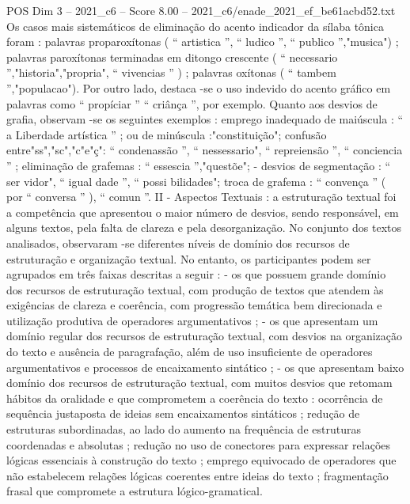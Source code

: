 \begin{textsample}{POS Dim 3 – 2021\_c6 – Score 8.00 – 2021\_c6/enade\_2021\_ef\_be61acbd52.txt}
Os casos mais sistemáticos de eliminação do acento indicador da sílaba tônica foram : palavras proparoxítonas ( “ artistica ”, “ ludico ”, “ publico ”,"musica") ; palavras paroxítonas terminadas em ditongo crescente ( “ necessario ”,"historia","propria", “ vivencias ” ) ; palavras oxítonas ( “ tambem ”,"populacao").
Por outro lado, destaca -se o uso indevido do acento gráfico em palavras como “ propíciar ” “ criânça ”, por exemplo.
Quanto aos desvios de grafia, observam -se os seguintes exemplos : emprego inadequado de maiúscula : “ a Liberdade artística ” ; ou de minúscula :"constituição"; confusão entre"ss","sc","c"e"ç": “ condenassão ”, “ nessessario", “ repreiensão ”, “ conciencia ” ; eliminação de grafemas : “ essescia ”,"questõe"; - desvios de segmentação : “ ser vidor", “ igual dade ”, “ possi bilidades"; troca de grafema : “ convença ” ( por “ conversa ” ), “ comun ”.
II - Aspectos Textuais : a estruturação textual foi a competência que apresentou o maior número de desvios, sendo responsável, em alguns textos, pela falta de clareza e pela desorganização.
No conjunto dos textos analisados, observaram -se diferentes níveis de domínio dos recursos de estruturação e organização textual.
No entanto, os participantes podem ser agrupados em três faixas descritas a seguir : - os que possuem grande domínio dos recursos de estruturação textual, com produção de textos que atendem às exigências de clareza e coerência, com progressão temática bem direcionada e utilização produtiva de operadores argumentativos ; - os que apresentam um domínio regular dos recursos de estruturação textual, com desvios na organização do texto e ausência de paragrafação, além de uso insuficiente de operadores argumentativos e processos de encaixamento sintático ; - os que apresentam baixo domínio dos recursos de estruturação textual, com muitos desvios que retomam hábitos da oralidade e que comprometem a coerência do texto : ocorrência de sequência justaposta de ideias sem encaixamentos sintáticos ; redução de estruturas subordinadas, ao lado do aumento na frequência de estruturas coordenadas e absolutas ; redução no uso de conectores para expressar relações lógicas essenciais à construção do texto ; emprego equivocado de operadores que não estabelecem relações lógicas coerentes entre ideias do texto ; fragmentação frasal que compromete a estrutura lógico-gramatical.

\end{textsample}
